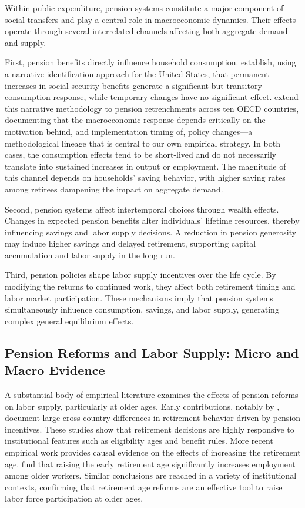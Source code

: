 \documentclass[11pt,english,a4paper, twoside, authoryear]{article}
\begin{document}
Within public expenditure, pension systems constitute a major component of social transfers and play a central role in macroeconomic dynamics. Their effects operate through several interrelated channels affecting both aggregate demand and supply.

First, pension benefits directly influence household consumption. \citet{RomerRomer2016} establish, using a narrative identification approach for the United States, that permanent increases in social security benefits generate a significant but transitory consumption response, while temporary changes have no significant effect. \citet{BiZubairy2023} extend this narrative methodology to pension retrenchments across ten OECD countries, documenting that the macroeconomic response depends critically on the motivation behind, and implementation timing of, policy changes---a methodological lineage that is central to our own empirical strategy. In both cases, the consumption effects tend to be short-lived and do not necessarily translate into sustained increases in output or employment. The magnitude of this channel depends on households' saving behavior, with higher saving rates among retirees dampening the impact on aggregate demand.

Second, pension systems affect intertemporal choices through wealth effects. Changes in expected pension benefits alter individuals' lifetime resources, thereby influencing savings and labor supply decisions. A reduction in pension generosity may induce higher savings and delayed retirement, supporting capital accumulation and labor supply in the long run.

Third, pension policies shape labor supply incentives over the life cycle. By modifying the returns to continued work, they affect both retirement timing and labor market participation. These mechanisms imply that pension systems simultaneously influence consumption, savings, and labor supply, generating complex general equilibrium effects.

\subsection{Pension Reforms and Labor Supply: Micro and Macro Evidence}

A substantial body of empirical literature examines the effects of pension reforms on labor supply, particularly at older ages. Early contributions, notably by \citet{GruberWise1999}, document large cross-country differences in retirement behavior driven by pension incentives. These studies show that retirement decisions are highly responsive to institutional features such as eligibility ages and benefit rules. More recent empirical work provides causal evidence on the effects of increasing the retirement age. \citet{StaubliZweimuller2013} find that raising the early retirement age significantly increases employment among older workers. Similar conclusions are reached in a variety of institutional contexts, confirming that retirement age reforms are an effective tool to raise labor force participation at older ages.
\end{document}
